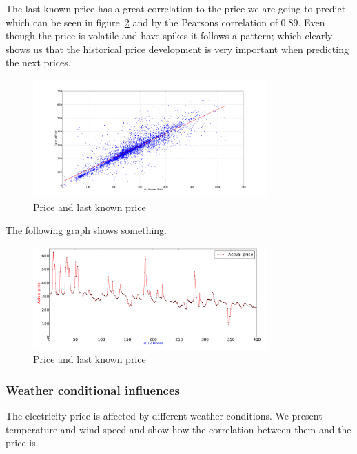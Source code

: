 The last known price has a great correlation to the price we are going to predict which can be seen in figure~\ref{fig:price_price} and by the Pearsons correlation of 0.89. Even though the price is volatile and have spikes it follows a pattern; which clearly shows us that the historical price development is very important when predicting the next prices.

\begin{figure}[H]
\centering
\includegraphics[width=0.8\textwidth]{billeder/priceVsLastKnownPrice.png}
\caption{Price and last known price}
\label{fig:price_price}
\end{figure}

The following graph shows something.
\begin{figure}[H]
\centering
\includegraphics[width=0.8\textwidth]{billeder/priceGraph400.png}
\caption{Price and last known price}
\label{fig:price_price}
\end{figure}

\subsubsection{Weather conditional influences}
\label{sec:priceWeatherInfluence}
The electricity price is affected by different weather conditions. We present temperature and wind speed and show how the correlation between them and the price is.


